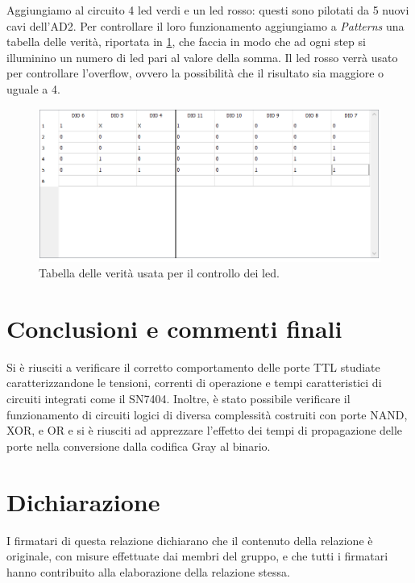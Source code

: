\documentclass[10pt, a4paper, italian]{article}
\begin{document}
Aggiungiamo al circuito 4 led verdi e un led rosso: questi sono pilotati da 5 nuovi cavi dell'AD2. Per controllare il loro funzionamento aggiungiamo a \emph{Patterns} una tabella delle verità, riportata in \cref{fig: Ver}, che faccia in modo che ad ogni step si illuminino un numero di led pari al valore della somma. Il led rosso verrà usato per controllare l'overflow, ovvero la possibilità che il risultato sia maggiore o uguale a 4.

\begin{figure}[htbp]
    \centering
    \includegraphics[width=0.8\linewidth]{TAB_LED}
    \caption{Tabella delle verità usata per il controllo dei led.}
    \label{fig: Ver}
\end{figure}

\section*{Conclusioni e commenti finali}
Si è riusciti a verificare il corretto comportamento delle porte TTL studiate
caratterizzandone le tensioni, correnti di operazione e tempi caratteristici
di circuiti integrati come il SN7404.
Inoltre, è stato possibile verificare il funzionamento di circuiti logici di
diversa complessità costruiti con porte NAND, XOR, e OR e si è riusciti ad
apprezzare l'effetto dei tempi di propagazione delle porte nella conversione
dalla codifica Gray al binario.

\section*{Dichiarazione}
I firmatari di questa relazione dichiarano che il contenuto della relazione \`e
originale, con misure effettuate dai membri del gruppo, e che tutti i firmatari
hanno contribuito alla elaborazione della relazione stessa.
\end{document}
